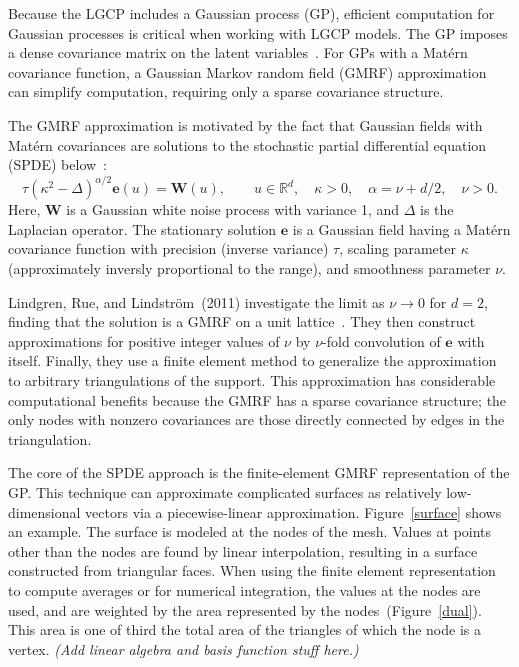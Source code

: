 \documentclass[]{interact}
\begin{document}
Because the LGCP includes a Gaussian process (GP), efficient computation for
Gaussian processes is critical when working with LGCP models. The GP imposes a
dense covariance matrix on the latent variables~\cite{rinla}. For GPs with a
Mat\'{e}rn covariance function, a Gaussian Markov random field (GMRF)
approximation can simplify computation, requiring only a sparse covariance
structure.

The GMRF approximation is motivated by the fact that Gaussian fields with
Mat\'{e}rn covariances are solutions to the stochastic partial differential
equation (SPDE) below~\cite{lindgrenetal}:
\begin{displaymath}
\tau(\kappa^{2} - \Delta)^{\alpha / 2} \mathbf{e}(u) = \mathbf{W}(u),
\qquad u \in \mathbb{R}^d, \quad \kappa > 0,
\quad \alpha = \nu + d/2, \quad \nu > 0.
\end{displaymath}
Here, \(\mathbf{W}\) is a Gaussian white noise process with variance 1, and
\(\Delta\) is the Laplacian operator. The stationary solution
\(\mathbf{e}\) is a Gaussian field having a Mat\'{e}rn covariance
function with precision (inverse variance) \(\tau\),  scaling parameter
\(\kappa\) (approximately inversly proportional to the range), and smoothness
parameter \(\nu\).

Lindgren, Rue, and Lindstr\"{o}m~(2011) investigate the limit as \(\nu \to 0\) for
\(d = 2\), finding that the solution is a GMRF on a unit
lattice~\cite{lindgrenetal}. They then construct approximations for positive
integer values of \(\nu\) by \(\nu\)-fold convolution of \(\mathbf{e}\)
with itself. Finally, they use a finite element method to generalize the
approximation to arbitrary triangulations of the support. This approximation
has considerable computational benefits because the GMRF has a sparse
covariance structure; the only nodes with nonzero covariances are those
directly connected by edges in the triangulation.

The core of the SPDE approach is the finite-element GMRF representation of the
GP. This technique can approximate complicated surfaces as relatively
low-dimensional vectors via a piecewise-linear approximation.
Figure~\ref{surface} shows an example. The surface is modeled at the nodes of
the mesh. Values at points other than the nodes are found by linear
interpolation, resulting in a surface constructed from triangular faces. When
using the finite element representation to compute averages or for numerical
integration, the values at the nodes are used, and are weighted by the area
represented by the nodes~(Figure~\ref{dual}). This area is one of third the
total area of the triangles of which the node is a vertex.
{\it (Add linear algebra and basis function stuff here.)}
\end{document}

